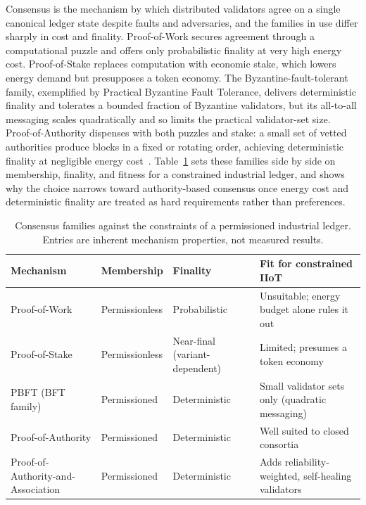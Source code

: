 Consensus is the mechanism by which distributed validators agree on a single
canonical ledger state despite faults and adversaries, and the families in use
differ sharply in cost and finality. Proof-of-Work secures agreement through a
computational puzzle and offers only probabilistic finality at very high energy
cost. Proof-of-Stake replaces computation with economic stake, which lowers
energy demand but presupposes a token economy. The Byzantine-fault-tolerant
family, exemplified by Practical Byzantine Fault Tolerance, delivers
deterministic finality and tolerates a bounded fraction of Byzantine validators,
but its all-to-all messaging scales quadratically and so limits the practical
validator-set size. Proof-of-Authority dispenses with both puzzles and stake: a
small set of vetted authorities produce blocks in a fixed or rotating order,
achieving deterministic finality at negligible energy cost~\cite{jain2025survey}.
Table~\ref{tab:consensus-comparison} sets these families side by side on
membership, finality, and fitness for a constrained industrial ledger, and shows
why the choice narrows toward authority-based consensus once energy cost and
deterministic finality are treated as hard requirements rather than preferences.

\begin{table}[!htbp]
  \centering
  \footnotesize
  \setlength{\tabcolsep}{4pt}
  \renewcommand{\arraystretch}{1.25}
  \caption{Consensus families against the constraints of a permissioned industrial ledger. Entries are inherent mechanism properties, not measured results.}
  \label{tab:consensus-comparison}
  \begin{tabularx}{\textwidth}{@{}
      >{\raggedright\arraybackslash}p{3.0cm}
      >{\raggedright\arraybackslash}p{2.1cm}
      >{\raggedright\arraybackslash}p{2.4cm}
      >{\raggedright\arraybackslash}X@{}}
    \toprule
    \textbf{Mechanism} & \textbf{Membership} & \textbf{Finality} & \textbf{Fit for constrained IIoT} \\
    \midrule
    Proof-of-Work                      & Permissionless & Probabilistic                  & Unsuitable; energy budget alone rules it out \\
    \addlinespace
    Proof-of-Stake                     & Permissionless & Near-final (variant-dependent) & Limited; presumes a token economy \\
    \addlinespace
    PBFT (BFT family)                  & Permissioned   & Deterministic                  & Small validator sets only (quadratic messaging) \\
    \addlinespace
    Proof-of-Authority                 & Permissioned   & Deterministic                  & Well suited to closed consortia \\
    \addlinespace
    Proof-of-Authority-and-Association & Permissioned   & Deterministic                  & Adds reliability-weighted, self-healing validators \\
    \bottomrule
  \end{tabularx}
\end{table}

